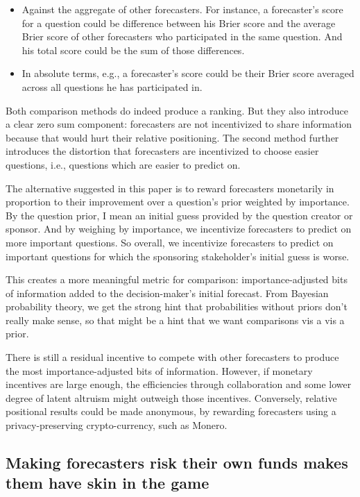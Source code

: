 \documentclass[]{article}
\providecommand{\tightlist}{%
  \setlength{\itemsep}{0pt}\setlength{\parskip}{0pt}}
\begin{document}
\begin{itemize}
\tightlist
\item
  Against the aggregate of other forecasters. For instance, a
  forecaster's score for a question could be difference between his
  Brier score and the average Brier score of other forecasters who
  participated in the same question. And his total score could be the
  sum of those differences.
\item
  In absolute terms, e.g., a forecaster's score could be their Brier
  score averaged across all questions he has participated in.
\end{itemize}

Both comparison methods do indeed produce a ranking. But they also
introduce a clear zero sum component: forecasters are not incentivized
to share information because that would hurt their relative positioning.
The second method further introduces the distortion that forecasters are
incentivized to choose easier questions, i.e., questions which are
easier to predict on.

The alternative suggested in this paper is to reward forecasters
monetarily in proportion to their improvement over a question's prior
weighted by importance. By the question prior, I mean an initial guess
provided by the question creator or sponsor. And by weighing by
importance, we incentivize forecasters to predict on more important
questions. So overall, we incentivize forecasters to predict on
important questions for which the sponsoring stakeholder's initial guess
is worse.

This creates a more meaningful metric for comparison:
importance-adjusted bits of information added to the decision-maker's
initial forecast. From Bayesian probability theory, we get the strong
hint that probabilities without priors don't really make sense, so that
might be a hint that we want comparisons vis a vis a prior.

There is still a residual incentive to compete with other forecasters to
produce the most importance-adjusted bits of information. However, if
monetary incentives are large enough, the efficiencies through
collaboration and some lower degree of latent altruism might outweigh
those incentives. Conversely, relative positional results could be made
anonymous, by rewarding forecasters using a privacy-preserving
crypto-currency, such as Monero.

\hypertarget{making-forecasters-risk-their-own-funds-makes-them-have-skin-in-the-game}{%
\subsection{Making forecasters risk their own funds makes them have skin
in the
game}\label{making-forecasters-risk-their-own-funds-makes-them-have-skin-in-the-game}}
\end{document}
